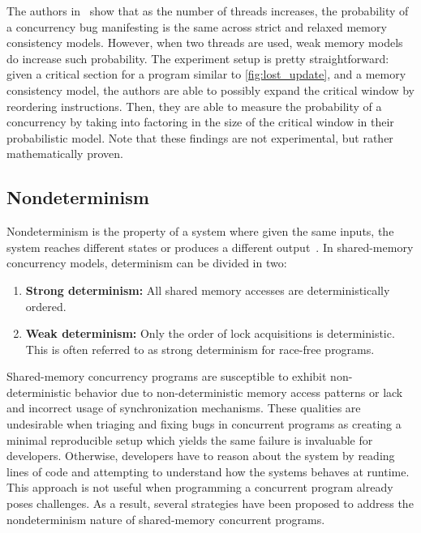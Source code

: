 The authors in~\cite{jaffe2011impactOfMemoryModels} show that
as the number of threads increases, the probability
of a concurrency bug manifesting is the same across strict and relaxed
memory consistency models. However, when two threads are used,
weak memory models do increase such probability. The experiment setup
is pretty straightforward: given a critical section for a program
similar to \autoref{fig:lost_update}, and a
memory consistency model, the authors are able to possibly
expand the critical window by reordering instructions.
Then, they are able to measure the probability of a concurrency
by taking into factoring in the size of the critical window
in their probabilistic model.
Note that these findings are not experimental, but rather
mathematically proven.


\subsection{Nondeterminism}

Nondeterminism is the property of a system
where given the same inputs, the system
reaches different states or produces
a different output~\cite{replayDeterminism}.
In shared-memory concurrency models, determinism can be divided in two:

\begin{enumerate}
    \item \textbf{Strong determinism:} All shared memory accesses are deterministically ordered.
    \item \textbf{Weak determinism:} Only the order of lock acquisitions is deterministic.
        This is often referred to as strong determinism for race-free programs.
\end{enumerate}

Shared-memory concurrency programs are susceptible
to exhibit non-deterministic behavior due to
non-deterministic memory access patterns
or lack and incorrect usage of synchronization mechanisms.
These qualities are undesirable when triaging
and fixing bugs in concurrent programs as
creating a minimal reproducible setup which
yields the same failure is invaluable for developers.
Otherwise, developers have to reason about the system
by reading lines of code and attempting
to understand how the systems behaves at runtime. This
approach is not useful when programming a concurrent
program already poses challenges. As a result, several strategies have been proposed
to address the nondeterminism nature of
shared-memory concurrent programs.

